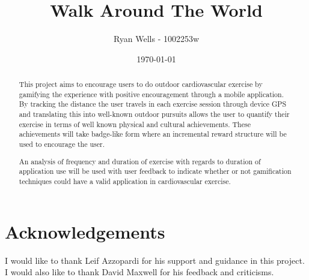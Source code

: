 \documentclass{l4proj}
\begin{document}
\newcommand{\todo}[1]{\textcolor{red}{#1}}
	
	
\title{Walk Around The World}
\author{Ryan Wells - 1002253w}
\date{\today}
\maketitle
\begin{abstract}

This project aims to encourage users to do outdoor cardiovascular
exercise by gamifying the experience with positive encouragement
through a mobile application. By tracking the distance the user
travels in each exercise session through device GPS and translating
this into well-known outdoor pursuits allows the user to quantify
their exercise in terms of well known physical and cultural
achievements. These achievements will take badge-like form where an
incremental reward structure will be used to encourage the user. 




An analysis of frequency and duration of exercise with regards to
duration of application use will be used with user feedback to
indicate whether or not gamification techniques could have a valid
application in cardiovascular exercise.  

\end{abstract}
\educationalconsent
\tableofcontents
\pagebreak
{}






\section{Acknowledgements}
I would like to thank Leif Azzopardi for his support and guidance in
this project. I would also like to thank David Maxwell for his
feedback and criticisms. 



\appendix




\end{document}
